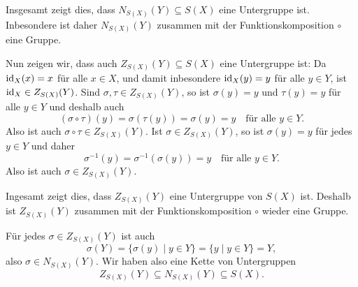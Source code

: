 Insgesamt zeigt dies, dass $N_{S(X)}(Y) \subseteq S(X)$ eine Untergruppe ist. Inbesondere ist daher $N_{S(X)}(Y)$ zusammen mit der Funktionskomposition $\circ$ eine Gruppe.

Nun zeigen wir, dass auch $Z_{S(X)}(Y) \subseteq S(X)$ eine Untergruppe ist: Da $\mathrm{id}_X(x) = x$ für alle $x \in X$, und damit inbesondere $\mathrm{id}_X(y) = y$ für alle $y \in Y$, ist $\mathrm{id}_X \in Z_{S(X)}(Y)$. Sind $\sigma, \tau \in Z_{S(X)}(Y)$, so ist $\sigma(y) = y$ und $\tau(y) = y$ für alle $y \in Y$ und deshalb auch
\[
 (\sigma \circ \tau)(y)
 = \sigma(\tau(y))
 = \sigma(y)
 = y
 \quad
 \text{für alle $y \in Y$}.
\]
Also ist auch $\sigma \circ \tau \in Z_{S(X)}(Y)$. Ist $\sigma \in Z_{S(X)}(Y)$, so ist $\sigma(y) = y$ für jedes $y \in Y$ und daher
\[
 \sigma^{-1}(y) = \sigma^{-1}(\sigma(y)) = y
 \quad
 \text{für alle $y \in Y$}.
\]
Also ist auch $\sigma \in Z_{S(X)}(Y)$.

Ingesamt zeigt dies, dass $Z_{S(X)}(Y)$ eine Untergruppe von $S(X)$ ist. Deshalb ist $Z_{S(X)}(Y)$ zusammen mit der Funktionskomposition $\circ$ wieder eine Gruppe.

Für jedes $\sigma \in Z_{S(X)}(Y)$ ist auch
\[
 \sigma(Y)
 = \{\sigma(y) \mid y \in Y\}
 = \{y \mid y \in Y\}
 = Y,
\]
also $\sigma \in N_{S(X)}(Y)$. Wir haben also eine Kette von Untergruppen
\[
 Z_{S(X)}(Y) \subseteq N_{S(X)}(Y) \subseteq S(X).
\]


